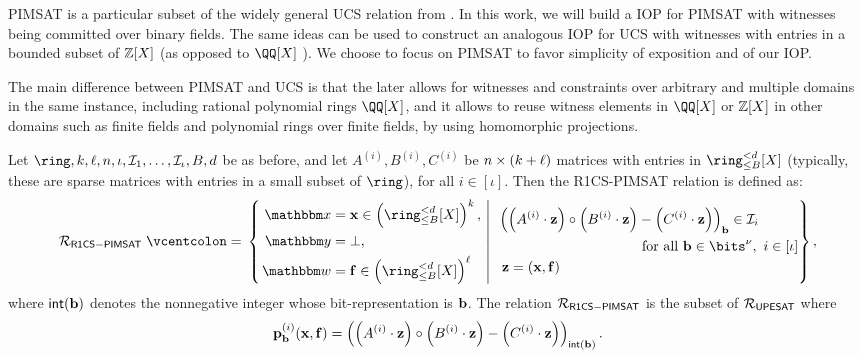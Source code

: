 \documentclass[11pt,letterpaper,usenames,dvipsnames]{article}
\begin{document}
\begin{remark}
PIMSAT is a particular subset of the widely general UCS relation from \cite{zincplus}. In this work, we will build a IOP for PIMSAT with witnesses being committed over binary fields. The same ideas can be used to construct an analogous IOP for UCS with witnesses with entries in a bounded subset of $\mathbb{Z}[X]$ (as opposed to $\QQ[X]$ ).  We choose to focus on PIMSAT to favor simplicity of exposition and of our IOP. 

The main difference between PIMSAT and UCS  is that the later allows for witnesses and constraints over arbitrary and multiple domains in the same instance, including rational polynomial rings $\QQ[X]$, and it allows to reuse witness elements in $\QQ[X]$ or $\mathbb{Z}[X]$ in other domains such as finite fields and polynomial rings over finite fields, by using   homomorphic projections.
\end{remark}

\newcommand{\ronecsideal}{\Relation_{\mathsf{R1CS-PIMSAT}}}
\begin{example}
Let $\ring,\inplen,\codedim,\numrows,\iota, \ideal_1, \ldots, \ideal_{\iota}, B, \moduledegree$ be as before, and let $A^{(i)},B^{(i)},C^{(i)}$ be $n \times (k+\ell)$ matrices with entries in $\ringtwobounds{B}{\moduledegree}[X]$ (typically, these are sparse matrices with entries in a small subset of $\ring$), for all $i\in [\iota]$. Then the R1CS-PIMSAT relation is defined as:
    $$
\ronecsideal \defeq \left\{\left. 
\begin{aligned}
    \inp &= \xx\in \left(\ringtwobounds{B}{\moduledegree}[X]\right)^{\inplen},\\
    \oracle &= \bot ,\\
    \wit &=\bff \in \left(\ringtwobounds{B}{\moduledegree}[X]\right)^\codedim
\end{aligned} 
\ \right| \ 
\begin{aligned}
    &\left(\left(A^{(i)}\cdot \zz\right)\circ \left(B^{(i)}\cdot \zz\right) - \left(C^{(i)}\cdot \zz\right)\right)_{\mathsf{\bb}} \in \ideal_i \\ &\qquad\qquad \qquad \qquad \qquad \text{ for all } \bb\in \bits^{\nu}, \ i \in [\iota]\\
    &\ \zz=(\xx, \bff)
\end{aligned}
\right\},
$$
where $\mathsf{int}(\mathbf{b})$ denotes the nonnegative integer whose bit-representation is $\mathbf{b}$.
The relation $\ronecsideal$ is the subset of $\mathcal{R}_{\mathsf{UPESAT}}$ where $$\mathbf{p}_{\mathbf{b}}^{(i)}(\mathbf{x},\mathbf{f})= \left(\left(A^{(i)}\cdot \mathbf{z}\right)\circ \left(B^{(i)}\cdot \mathbf{z}\right) - \left(C^{(i)}\cdot \mathbf{z}\right)\right)_{\mathsf{int}(\mathbf{b})}.$$
\end{example}
\end{document}
